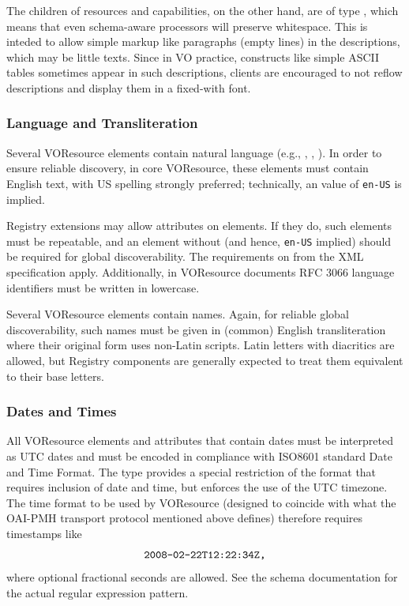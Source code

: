\documentclass[11pt,a4paper]{ivoa}
\begin{document}
The  children of resources and capabilities, on the
other hand, are of type , which means that even
schema-aware processors will preserve whitespace.  This is inteded to
allow simple markup like paragraphs (empty lines) in the descriptions,
which may be little texts.  Since in VO practice, constructs like simple
ASCII tables sometimes appear in such descriptions, clients are
encouraged to not reflow descriptions and display them in a fixed-with
font.

\subsubsection{Language and Transliteration}

Several VOResource elements contain natural language (e.g.,
, , ).  In order to
ensure reliable discovery, in core VOResource, these elements must
contain English text, with US spelling strongly preferred; technically,
an  value of \texttt{en-US} is implied.

Registry extensions may allow  attributes on elements.
If they do, such elements must be repeatable, and an element without
 (and hence, \texttt{en-US} implied) should be required
for global discoverability.  The requirements on  from
the XML specification \citep{std:XML} apply.  Additionally, in
VOResource documents RFC 3066 language identifiers must be written in
lowercase.

Several VOResource elements contain names.  Again, for reliable global
discoverability, such names must be given in (common) English
transliteration where their original form uses non-Latin scripts.
Latin letters with diacritics are allowed, but Registry components are
generally expected to treat them equivalent to their base letters.

\subsubsection{Dates and Times}

All VOResource elements and attributes that contain dates must be
interpreted as UTC dates and must be encoded in compliance with ISO8601
\citep{std:iso8601}
standard Date and Time Format.  The  type
provides a special restriction of the format that requires inclusion of
date and time, but enforces the use of the UTC timezone.  The time
format to be used by VOResource (designed to coincide with
what the OAI-PMH transport protocol mentioned above defines)
therefore requires timestamps like
$$\hbox{\texttt{2008-02-22T12:22:34Z,}}$$
where optional fractional seconds are allowed.  See the schema
documentation for the actual regular expression pattern.
\end{document}
